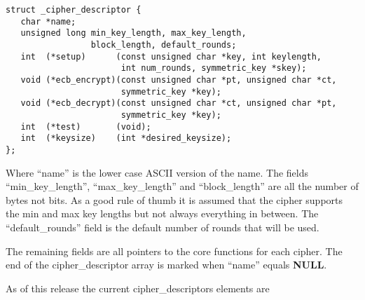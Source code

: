 \documentclass[b5paper]{book}
\begin{document}
\begin{verbatim}
struct _cipher_descriptor {
   char *name;
   unsigned long min_key_length, max_key_length, 
                 block_length, default_rounds;
   int  (*setup)      (const unsigned char *key, int keylength, 
                       int num_rounds, symmetric_key *skey);
   void (*ecb_encrypt)(const unsigned char *pt, unsigned char *ct, 
                       symmetric_key *key);
   void (*ecb_decrypt)(const unsigned char *ct, unsigned char *pt,
                       symmetric_key *key);
   int  (*test)       (void);
   int  (*keysize)    (int *desired_keysize);
};
\end{verbatim}

Where ``name'' is the lower case ASCII version of the name.  The fields ``min\_key\_length'', ``max\_key\_length'' and
``block\_length'' are all the number of bytes not bits.  As a good rule of thumb it is assumed that the cipher supports
the min and max key lengths but not always everything in between.  The ``default\_rounds'' field is the default number
of rounds that will be used.

The remaining fields are all pointers to the core functions for each cipher.  The end of the cipher\_descriptor array is
marked when ``name'' equals {\bf NULL}.

As of this release the current cipher\_descriptors elements are
\end{document}
